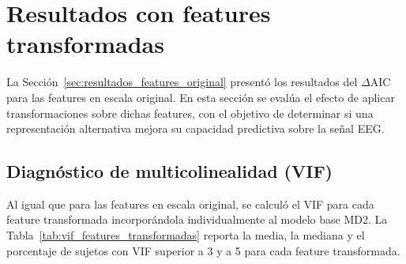 \section{Resultados con features transformadas}
\label{sec:resultados_features_transformadas}

La Sección~\ref{sec:resultados_features_original} presentó los resultados del $\Delta$AIC 
para las features en escala original. En esta sección se evalúa el efecto 
de aplicar transformaciones sobre dichas features, con el objetivo de 
determinar si una representación alternativa mejora su capacidad predictiva 
sobre la señal EEG. 

\subsection{Diagnóstico de multicolinealidad (VIF)}

Al igual que para las features en escala original, se calculó el VIF 
para cada feature transformada incorporándola individualmente al modelo 
base MD2. La Tabla~\ref{tab:vif_features_transformadas} reporta la 
media, la mediana y el porcentaje de sujetos con VIF superior a 3 y 
a 5 para cada feature transformada.

